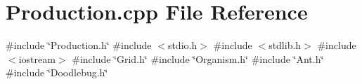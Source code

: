 \section{Production.\+cpp File Reference}
\label{Production_8cpp}
{\ttfamily \#include \char`\"{}Production.\+h\char`\"{}}\newline
{\ttfamily \#include $<$stdio.\+h$>$}\newline
{\ttfamily \#include $<$stdlib.\+h$>$}\newline
{\ttfamily \#include $<$iostream$>$}\newline
{\ttfamily \#include \char`\"{}Grid.\+h\char`\"{}}\newline
{\ttfamily \#include \char`\"{}Organism.\+h\char`\"{}}\newline
{\ttfamily \#include \char`\"{}Ant.\+h\char`\"{}}\newline
{\ttfamily \#include \char`\"{}Doodlebug.\+h\char`\"{}}\newline
